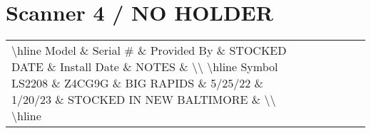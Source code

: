 \documentclass{article}%
\begin{document}
%
\section{Scanner 4 / NO HOLDER}%
\label{sec:Scanner4/NOHOLDER}%
\begin{tabularx}{\textwidth}{|X|X|X|X|X|X|X|}%
\textbackslash{}hline%
Model \& Serial \# \& Provided By \& STOCKED DATE \& Install Date \& NOTES \&  \textbackslash{}\textbackslash{}%
\textbackslash{}hline%
Symbol LS2208 \& Z4CG9G \& BIG RAPIDS \& 5/25/22 \& 1/20/23 \& STOCKED IN NEW BALTIMORE \&  \textbackslash{}\textbackslash{}%
\textbackslash{}hline%
\end{tabularx}

%
\end{document}
